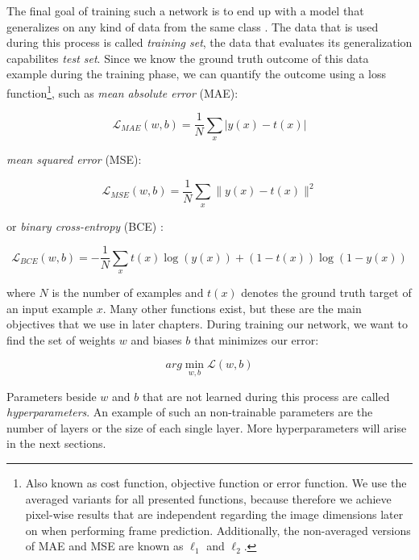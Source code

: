 The final goal of training such a network is to end up with a model that generalizes on any kind of data from the same class \parencite[p. 2]{pattern_and_ml}. The data that is used during this process is called \textit{training set}, the data that evaluates its generalization capabilites \textit{test set}. Since we know the ground truth outcome of this data example during the training phase, we can quantify the outcome using a loss function\footnote{Also known as cost function, objective function or error function. We use the averaged variants for all presented functions, because therefore we achieve pixel-wise results that are independent regarding the image dimensions later on when performing frame prediction. Additionally, the non-averaged versions of MAE and MSE are known as $ \ell_{1} $ and $ \ell_{2} $.}, such as \textit{mean absolute error} (MAE):

\begin{equation} \label{eq:mae}
  \mathcal{L}_{MAE}(w, b)=\frac{1}{N} \sum\limits_{x} | y(x) - t(x) |
\end{equation}

\textit{mean squared error} (MSE):

\begin{equation} \label{eq:mse}
  \mathcal{L}_{MSE}(w, b)=\frac{1}{N} \sum\limits_{x} \| y(x) - t(x) \|^2
\end{equation}

or \textit{binary cross-entropy} (BCE) \parencite{conv_lstm_nowcasting}:

\begin{equation} \label{eq:bce}
  \mathcal{L}_{BCE}(w, b)= -\frac{1}{N} \sum\limits_{x} t(x) \log{(y(x))} + (1-t(x)) \log{(1-y(x))} 
\end{equation}

where $ N $ is the number of examples and $ t(x) $ denotes the ground truth target of an input example $x$. Many other functions exist, but these are the main objectives that we use in later chapters. During training our network, we want to find the set of weights $ w $ and biases $ b $ that minimizes our error:

\begin{equation} \label{eq:min-loss}
  arg\min_{w, b} \mathcal{L}(w, b)
\end{equation}

Parameters beside $ w $ and $ b $ that are not learned during this process are called \textit{hyperparameters}. An example of such an non-trainable parameters are the number of layers or the size of each single layer. More hyperparameters will arise in the next sections.


